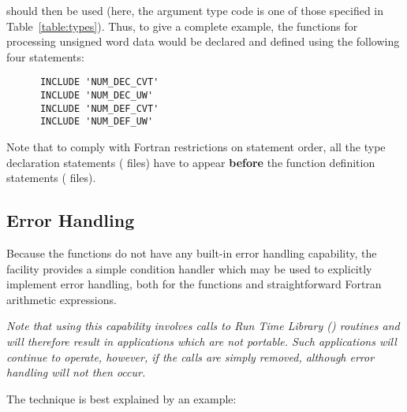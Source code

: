 should then be used (here, the argument type code  is one of
those specified in Table~\ref{table:types}).
Thus, to give a complete example, the  functions for processing
unsigned word data would be declared and defined using the following four
statements:

\begin{verbatim}
      INCLUDE 'NUM_DEC_CVT'
      INCLUDE 'NUM_DEC_UW'
      INCLUDE 'NUM_DEF_CVT'
      INCLUDE 'NUM_DEF_UW'
\end{verbatim}

Note that to comply with Fortran restrictions on statement order, all the
type declaration statements ( files) have to appear {\bf
before} the function definition statements ( files).

\subsection{ Error Handling}
\label{section:num:error}

Because the  functions do not have any built-in error handling
capability, the  facility provides a simple  condition
handler which may be used to explicitly implement error handling, both for
the  functions and straightforward Fortran arithmetic
expressions.

{\em Note that using this capability involves calls to  Run
Time Library () routines and will therefore result in applications
which are not portable.
Such applications will continue to operate, however, if the  calls
are simply removed, although error handling will not then occur.
}

The technique is best explained by an example:

